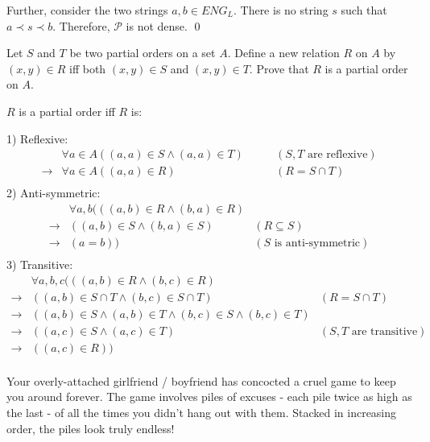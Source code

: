 \documentclass[addpoints]{exam}
\begin{document}
\begin{questions}
\begin{solution}
    Further, consider the two strings $a,b \in ENG_L$. There is no string $s$ such that $a \prec s \prec b$. Therefore, $\mathcal{P}$ is not dense. \qed
     
  \end{solution}

\question
     Let $S$ and $T$ be two partial orders on a set $A$. Define a new relation $R$ on $A$ by $(x,y)\in R$ iff both $(x,y) \in S$ and $(x,y) \in T$. Prove that $R$ is a partial order on $A$.

    
      \begin{solution}
    $R$ is a partial order iff $R$ is:
    
    1) Reflexive: 
    \begin{align*}
    &\forall a \in A((a,a) \in S \wedge (a,a) \in T) \quad \quad &(S,T \text{ are reflexive})\\
    \rightarrow &\forall a \in A ((a,a) \in R) \quad \quad &(R = S \cap T)\\   
    \end{align*}
    2) Anti-symmetric:
	\begin{align*}
	&\forall a,b(((a,b) \in R \wedge (b,a) \in R)\\
	\rightarrow &((a,b) \in S \wedge (b,a) \in S) &(R \subseteq S)\\
	\rightarrow &(a = b)) &(S \text{ is anti-symmetric})\\
	\end{align*}
	3) Transitive:
	\begin{align*}
	&\forall a,b,c(((a,b) \in R \wedge (b,c) \in R)\\
	\rightarrow &((a,b) \in S \cap T \wedge (b,c) \in S \cap T) &(R = S \cap T)\\
	\rightarrow &((a,b) \in S \wedge (a,b) \in T \wedge (b,c) \in S \wedge (b,c) \in T)\\
	\rightarrow &((a,c) \in S \wedge (a,c) \in T) &(S,T \text{ are transitive})\\
	\rightarrow &((a,c) \in R)) \\
	\end{align*}
	
  \end{solution}

\question Your overly-attached girlfriend / boyfriend has concocted a cruel game to keep you around forever. The game involves piles of excuses - each pile twice as high as the last - of all the times you didn't hang out with them. Stacked in increasing order, the piles look truly endless! 


\end{questions}
\end{document}
